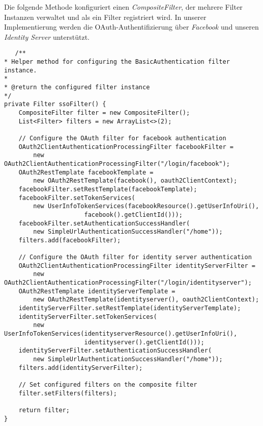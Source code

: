 Die folgende Methode konfiguriert einen \emph{CompositeFilter}, der mehrere Filter Instanzen verwaltet und als ein Filter registriert wird. In unserer Implementierung werden die OAuth-Authentifizierung über \emph{Facebook} und unseren \emph{Identity Server} unterstützt.
\begin{verbatim}
   /**
* Helper method for configuring the BasicAuthentication filter instance.
*
* @return the configured filter instance
*/
private Filter ssoFilter() {
	CompositeFilter filter = new CompositeFilter();
	List<Filter> filters = new ArrayList<>(2);
	
	// Configure the OAuth filter for facebook authentication
	OAuth2ClientAuthenticationProcessingFilter facebookFilter = 
		new OAuth2ClientAuthenticationProcessingFilter("/login/facebook");
	OAuth2RestTemplate facebookTemplate = 
		new OAuth2RestTemplate(facebook(), oauth2ClientContext);
	facebookFilter.setRestTemplate(facebookTemplate);
	facebookFilter.setTokenServices(
		new UserInfoTokenServices(facebookResource().getUserInfoUri(),
					  facebook().getClientId()));
	facebookFilter.setAuthenticationSuccessHandler(
		new SimpleUrlAuthenticationSuccessHandler("/home"));
	filters.add(facebookFilter);
	
	// Configure the OAuth filter for identity server authentication
	OAuth2ClientAuthenticationProcessingFilter identityServerFilter = 
		new OAuth2ClientAuthenticationProcessingFilter("/login/identityserver");
	OAuth2RestTemplate identityServerTemplate = 
		new OAuth2RestTemplate(identityserver(), oauth2ClientContext);
	identityServerFilter.setRestTemplate(identityServerTemplate);
	identityServerFilter.setTokenServices(
		new UserInfoTokenServices(identityserverResource().getUserInfoUri(), 
					  identityserver().getClientId()));
	identityServerFilter.setAuthenticationSuccessHandler(
		new SimpleUrlAuthenticationSuccessHandler("/home"));
	filters.add(identityServerFilter);
	
	// Set configured filters on the composite filter
	filter.setFilters(filters);
	
	return filter;
}
\end{verbatim}
\ \newpage

